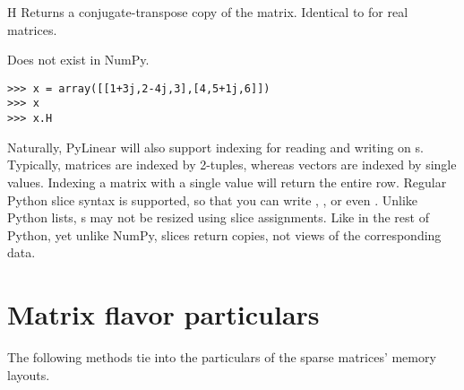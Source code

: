 \begin{memberdesc}[Matrix]{H}
  Returns a conjugate-transpose copy of the matrix.
  Identical to  for real matrices.

  Does not exist in NumPy.
\begin{verbatim}
>>> x = array([[1+3j,2-4j,3],[4,5+1j,6]])
>>> x
>>> x.H
\end{verbatim}
\end{memberdesc}

Naturally, PyLinear will also support indexing for reading and writing
on s. Typically, matrices are indexed by 2-tuples,
whereas vectors are indexed by single values. Indexing a matrix with a
single value will return the entire row. Regular Python slice syntax
is supported, so that you can write , ,
or even . Unlike Python lists, s may not be
resized using slice assignments. Like in the rest of Python, yet
unlike NumPy, slices return copies, not views of the corresponding
data.

\section{Matrix flavor particulars}

The following methods tie into the particulars of the sparse matrices'
memory layouts.

